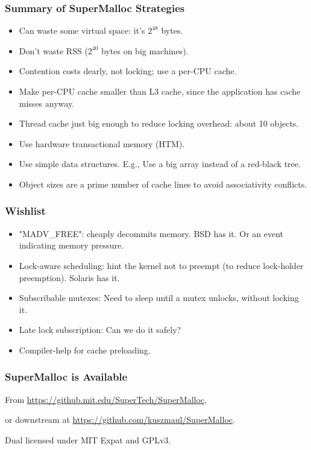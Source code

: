 \documentclass[xcolor=dvipsnames,14pt]{beamer}
\begin{document}
\begin{frame}
\frametitle{Summary of SuperMalloc Strategies}

\begin{itemize}
\item Can waste some virtual space: it's $2^{48}$ bytes.
\item Don't waste RSS ($2^{40}$ bytes on big machines).
\item Contention costs dearly, not locking;  use a per-CPU cache.
\item Make per-CPU cache smaller than L3 cache, since the application
  has cache misses anyway.
\item Thread cache just big enough to reduce locking overhead: about 10 objects.
\item Use hardware transactional memory (HTM).
\item Use simple data structures.  E.g., Use a big array instead of a red-black tree.
\item Object sizes are a prime number of cache lines to avoid
  associativity conflicts.
\end{itemize}

\end{frame}

\begin{frame}[fragile]
\frametitle{Wishlist}

\begin{itemize}
\item "MADV_FREE": cheaply decommits memory.  BSD has it.
Or an event indicating memory pressure.
\item Lock-aware scheduling: hint the kernel not to preempt (to
reduce lock-holder preemption).  Solaris has it.
\item Subscribable mutexes:  Need to sleep until a mutex unlocks, without locking it.
\item Late lock subscription: Can we do it safely?
\item Compiler-help for cache preloading.
\end{itemize}

\end{frame}

\begin{frame}
\frametitle{SuperMalloc is Available}

From {\small \url{https://github.mit.edu/SuperTech/SuperMalloc}},

or downstream at {\small \url{https://github.com/kuszmaul/SuperMalloc}}.

Dual licensed under MIT Expat and GPLv3.
\end{frame}
\end{document}
